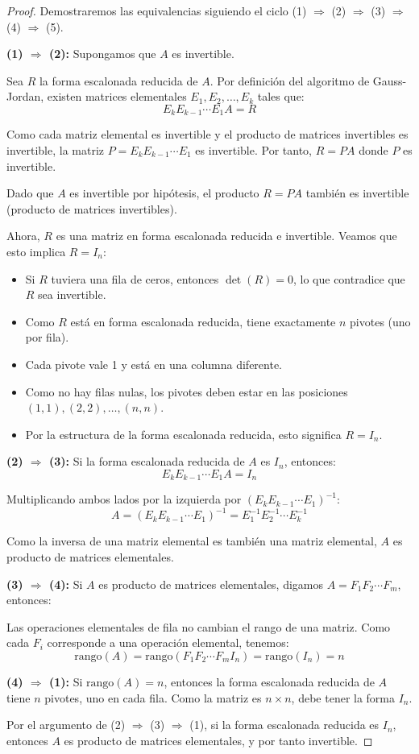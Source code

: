 \begin{proof}
Demostraremos las equivalencias siguiendo el ciclo (1) $\Rightarrow$ (2) $\Rightarrow$ (3) $\Rightarrow$ (4) $\Rightarrow$ (5).

\textbf{(1) $\Rightarrow$ (2):} Supongamos que $A$ es invertible. 

Sea $R$ la forma escalonada reducida de $A$. Por definición del algoritmo de Gauss-Jordan, existen matrices elementales $E_1, E_2, \ldots, E_k$ tales que:
\[E_k E_{k-1} \cdots E_1 A = R\]

Como cada matriz elemental es invertible y el producto de matrices invertibles es invertible, la matriz $P = E_k E_{k-1} \cdots E_1$ es invertible. Por tanto, $R = PA$ donde $P$ es invertible.

Dado que $A$ es invertible por hipótesis, el producto $R = PA$ también es invertible (producto de matrices invertibles).

Ahora, $R$ es una matriz en forma escalonada reducida e invertible. Veamos que esto implica $R = I_n$:
\begin{itemize}
    \item Si $R$ tuviera una fila de ceros, entonces $\det(R) = 0$, lo que contradice que $R$ sea invertible.
    \item Como $R$ está en forma escalonada reducida, tiene exactamente $n$ pivotes (uno por fila).
    \item Cada pivote vale 1 y está en una columna diferente.
    \item Como no hay filas nulas, los pivotes deben estar en las posiciones $(1,1), (2,2), \ldots, (n,n)$.
    \item Por la estructura de la forma escalonada reducida, esto significa $R = I_n$.
\end{itemize}

\textbf{(2) $\Rightarrow$ (3):} Si la forma escalonada reducida de $A$ es $I_n$, entonces:
\[E_k E_{k-1} \cdots E_1 A = I_n\]

Multiplicando ambos lados por la izquierda por $(E_k E_{k-1} \cdots E_1)^{-1}$:
\[A = (E_k E_{k-1} \cdots E_1)^{-1} = E_1^{-1} E_2^{-1} \cdots E_k^{-1}\]

Como la inversa de una matriz elemental es también una matriz elemental, $A$ es producto de matrices elementales.

\textbf{(3) $\Rightarrow$ (4):} Si $A$ es producto de matrices elementales, digamos $A = F_1 F_2 \cdots F_m$, entonces:

Las operaciones elementales de fila no cambian el rango de una matriz. Como cada $F_i$ corresponde a una operación elemental, tenemos:
\[\text{rango}(A) = \text{rango}(F_1 F_2 \cdots F_m I_n) = \text{rango}(I_n) = n\]

\textbf{(4) $\Rightarrow$ (1):} Si $\text{rango}(A) = n$, entonces la forma escalonada reducida de $A$ tiene $n$ pivotes, uno en cada fila. Como la matriz es $n \times n$, debe tener la forma $I_n$.

Por el argumento de (2) $\Rightarrow$ (3) $\Rightarrow$ (1), si la forma escalonada reducida es $I_n$, entonces $A$ es producto de matrices elementales, y por tanto invertible.
\end{proof}

